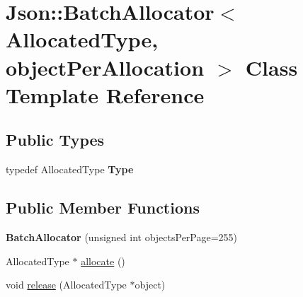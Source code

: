 \hypertarget{class_json_1_1_batch_allocator}{\section{Json\-:\-:Batch\-Allocator$<$ Allocated\-Type, object\-Per\-Allocation $>$ Class Template Reference}
\label{class_json_1_1_batch_allocator}
}
\subsection*{Public Types}
\begin{DoxyCompactItemize}
\item 
\hypertarget{class_json_1_1_batch_allocator_a031e753885fcb007c20511e15f84d1a4}{typedef Allocated\-Type {\bfseries Type}}\label{class_json_1_1_batch_allocator_a031e753885fcb007c20511e15f84d1a4}

\end{DoxyCompactItemize}
\subsection*{Public Member Functions}
\begin{DoxyCompactItemize}
\item 
\hypertarget{class_json_1_1_batch_allocator_a96aae4d9032847b074e72a0cf32bc9ea}{{\bfseries Batch\-Allocator} (unsigned int objects\-Per\-Page=255)}\label{class_json_1_1_batch_allocator_a96aae4d9032847b074e72a0cf32bc9ea}

\item 
Allocated\-Type $\ast$ \hyperlink{class_json_1_1_batch_allocator_a4909756c2d33bd0f07662e88e4f850dd}{allocate} ()
\item 
void \hyperlink{class_json_1_1_batch_allocator_aceb116aceb6bb5bbcfd05433abc04ba5}{release} (Allocated\-Type $\ast$object)
\end{DoxyCompactItemize}


